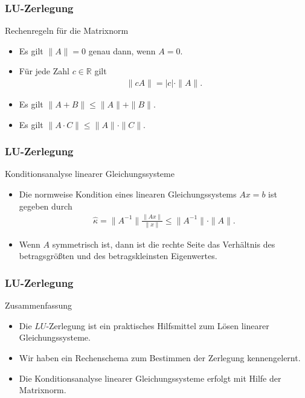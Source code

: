 \documentclass{beamer}
\newcommand\RR{\mathbb R}
\renewcommand{\ae}{\"a}
\renewcommand{\oe}{\"o}
\newcommand{\ue}{\"u}
\newcommand{\mytitle}{LU-Zerlegung}
\begin{document}
\begin{frame}\frametitle{\mytitle}
	\begin{block}{Rechenregeln f\ue r die Matrixnorm}
		\begin{itemize}
			\item Es gilt $\|A\|=0$ genau dann, wenn $A=0$.
			\item F\ue r jede Zahl $c\in\RR$ gilt
				\begin{align*}
				\|cA\|=|c|\cdot\|A\|.
				\end{align*}
			\item Es gilt $\|A+B\|\leq\|A\|+\|B\|$.
			\item Es gilt $\|A\cdot C\|\leq\|A\|\cdot\|C\|$.
		\end{itemize}
	\end{block}
\end{frame}

\begin{frame}\frametitle{\mytitle}
	\begin{block}{Konditionsanalyse linearer Gleichungssysteme}
		\begin{itemize}
			\item Die normweise Kondition eines linearen Gleichungssystems $Ax=b$ ist gegeben durch
				\begin{align*}
					\hat\kappa=\|A^{-1}\|\frac{\|Ax\|}{\|x\|}\leq\|A^{-1}\|\cdot\|A\|.
				\end{align*}
			\item Wenn $A$ symmetrisch ist, dann ist die rechte Seite das Verh\ae ltnis des betragsgr\oe\ss ten und des betragskleinsten Eigenwertes.
		\end{itemize}
	\end{block}
\end{frame}

\begin{frame}\frametitle{\mytitle}
	\begin{block}{Zusammenfassung}
		\begin{itemize}
			\item Die $LU$-Zerlegung ist ein praktisches Hilfsmittel zum L\oe sen linearer Gleichungssysteme.
			\item Wir haben ein Rechenschema zum Bestimmen der Zerlegung kennengelernt.
			\item Die Konditionsanalyse linearer Gleichungssysteme erfolgt mit Hilfe der Matrixnorm.
		\end{itemize}
	\end{block}
\end{frame}
\end{document}
